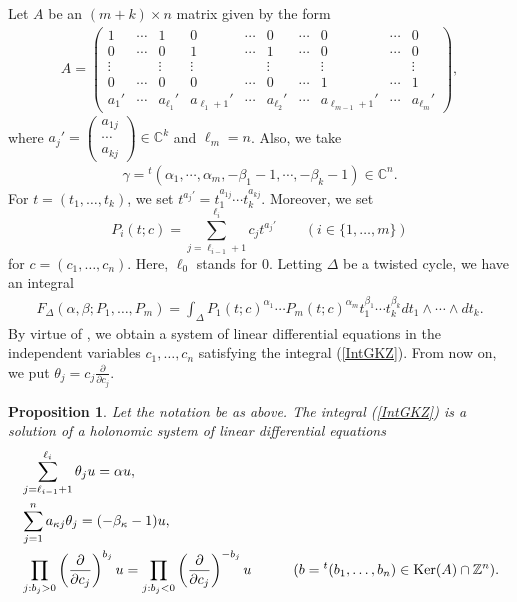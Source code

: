 \documentclass[10pt]{article}
\newtheorem{prop}{Proposition}[section]
\begin{document}
Let $A$ be an $(m+k)\times n$ matrix given by the form
\begin{align}\label{MatrixA}
A=
\begin{pmatrix}
1 &\cdots & 1 &0 &\cdots &0 &\cdots &0 &\cdots &0 \\  
0& \cdots&0 & 1 &\cdots & 1 & \cdots &0 &\cdots &0  \\
\vdots& &\vdots  &\vdots &     &\vdots &  &\vdots &  &\vdots  \\  
0&\cdots &0   &0&\cdots &0  & \cdots   & 1 &\cdots & 1 \\
a_1'& \cdots & a_{\ell_1}' & a_{\ell_1+1}' & \cdots & a_{\ell_2}' & \cdots & a_{\ell_{m-1}+1}' &\cdots& a_{\ell_m}'
\end{pmatrix},
\end{align}
where $a_j'=\begin{pmatrix} a_{1j} \\  \cdots \\ a_{kj}\end{pmatrix} \in \mathbb{C}^k$ and $\ell_m=n$. 
Also, we take
\begin{align}\label{VectorGamma}
\gamma
={}^t(\alpha_1 , \cdots , \alpha_m ,-\beta_1-1 , \cdots , -\beta_k -1) \in \mathbb{C}^n.
\end{align}
For $t=(t_1,\ldots,t_k)$, we set 
$t^{a_j'} = t_1^{a_{1j}} \cdots t_k^{a_{kj}}$.
Moreover, we set
$$
P_i (t; c) = \sum_{j=\ell_{i-1}+1}^{\ell_i} c_j t^{a_j'} \quad \quad (i\in\{1,\ldots,m\})
$$
for $c=(c_1,\ldots,c_n)$.
Here, $\ell_0$ stands for $0$.
Letting $\Delta$ be a twisted cycle, we have an integral
\begin{align}\label{IntGKZ}
F_\Delta (\alpha,\beta; P_1,\ldots,P_m)
=\int_{\Delta} P_1(t;c)^{\alpha_1} \cdots P_m(t;c)^{\alpha_m} t_1^{\beta_1} \cdots t_k^{\beta_k} dt_1 \wedge \cdots \wedge dt_k.
\end{align}
By virtue of \cite{GKZ},
we obtain a system of linear differential equations in the independent variables $c_1,\ldots, c_n$ satisfying the integral (\ref{IntGKZ}). 
From now on, we put
$\displaystyle \theta_j=c_j \frac{\partial}{\partial c_j}$.

\begin{prop}\label{PropGKZ}
Let the notation be as above.
The integral (\ref{IntGKZ}) is a solution of a holonomic system of linear differential equations
\begin{align}
&\displaystyle \sum_{j=\ell_{i-1}+1}^{\ell_i} \theta_j u =\alpha u,\label{GKZ1}\\
&\displaystyle \sum_{j=1}^n a_{\kappa  j } \theta_j =(-\beta_\kappa -1) u, \label{GKZ2}\\
&\displaystyle \prod_{j: b_j>0} \left(\frac{\partial}{\partial c_j}\right)^{b_j} u =  \prod_{j: b_j<0} \left(\frac{\partial}{\partial c_j}\right)^{-b_j} u \quad\quad\quad (b={}^t (b_1,\ldots,b_n) \in {\rm Ker}(A) \cap \mathbb{Z}^n).  \label{GKZ3}
\end{align}
\end{prop}
\end{document}
